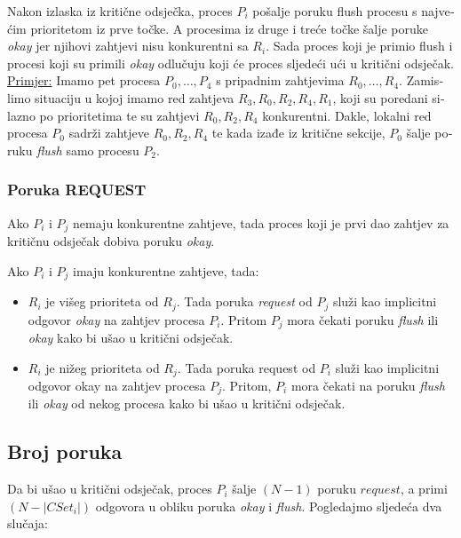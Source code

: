 \documentclass[12pt]{rectors}
\begin{document}
\begin{otherlanguage}{croatian}
Nakon izlaska iz kritične odsječka, proces $P_i$ pošalje poruku flush procesu s najvećim prioritetom iz prve točke. A procesima iz druge i treće točke šalje poruke \textit{okay} jer njihovi zahtjevi nisu konkurentni sa $R_i$. Sada proces koji je primio flush i procesi koji su primili \textit{okay} odlučuju koji će proces sljedeći ući u kritični odsječak.\\


\underline{Primjer:} Imamo pet procesa $P_0, \hdots, P_4$ s pripadnim zahtjevima $R_0, \hdots, R_4$. Zamislimo
situaciju u kojoj imamo red zahtjeva $R_3, R_0, R_2, R_4, R_1$, koji su poredani silazno po
prioritetima te su zahtjevi $R_0, R_2, R_4$ konkurentni. Dakle, lokalni red procesa $P_0$ sadrži
zahtjeve $R_0, R_2, R_4$ te kada izađe iz kritične sekcije, $P_0$ šalje poruku \textit{flush} samo procesu
$P_2$.

\subsubsection{Poruka REQUEST}
Ako $P_i$  i $P_j$ nemaju konkurentne zahtjeve, tada proces koji je prvi dao zahtjev za kritičnu odsječak dobiva poruku \textit{okay}.

Ako $P_i$  i $P_j$ imaju konkurentne zahtjeve, tada:

\begin{itemize}
	\item $R_i$ je višeg prioriteta od $R_j$. Tada poruka \textit{request} od $P_j$ služi kao 	implicitni odgovor \textit{okay} na zahtjev procesa $P_i$. Pritom $P_j$ mora čekati poruku \textit{flush} ili \textit{okay} kako bi ušao u kritični odsječak.
	\item $R_i$ je nižeg prioriteta od $R_j$. Tada poruka request od $P_i$  služi kao implicitni odgovor okay na zahtjev procesa $P_j$. Pritom, $P_i$ mora čekati na poruku \textit{flush} ili \textit{okay} od nekog procesa kako bi ušao u kritični odsječak.
\end{itemize}

\subsection{Broj poruka}
Da bi ušao u kritični odsječak, proces $P_i$ šalje $(N-1)$ poruku $request$, a primi $(N - |CSet_i|)$ odgovora u obliku poruka \textit{okay} i \textit{flush}.
Pogledajmo sljedeća dva slučaja:


\end{otherlanguage}
\end{document}
